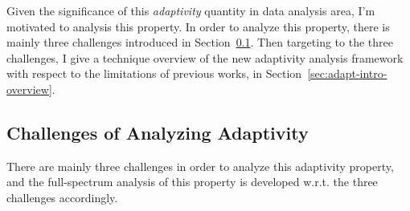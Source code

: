 Given the significance of this \emph{adaptivity} quantity in data analysis area,
I'm motivated to analysis this property.
In order to analyze this property, there is mainly three challenges introduced in Section~\ref{sec:adapt-intro-challenge}.
Then targeting to the three challenges, I give a technique overview of the new adaptivity analysis framework
with respect to the limitations of previous works, in Section~\ref{sec:adapt-intro-overview}.

\subsection{Challenges of Analyzing Adaptivity}
\label{sec:adapt-intro-challenge}
There are mainly three challenges in order to analyze this adaptivity property, 
and the full-spectrum analysis of this property is 
developed w.r.t. the three challenges accordingly.

